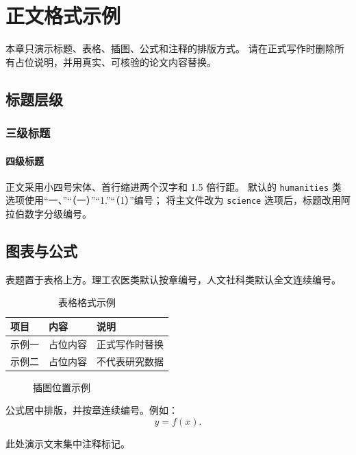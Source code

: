 \chapter{正文格式示例}

本章只演示标题、表格、插图、公式和注释的排版方式。
请在正式写作时删除所有占位说明，并用真实、可核验的论文内容替换。

\section{标题层级}

\subsection{三级标题}

\subsubsection{四级标题}

正文采用小四号宋体、首行缩进两个汉字和 1.5 倍行距。
默认的 \texttt{humanities} 类选项使用“一、”“（一）”“1.”“（1）”编号；
将主文件改为 \texttt{science} 选项后，标题改用阿拉伯数字分级编号。

\section{图表与公式}

表题置于表格上方。理工农医类默认按章编号，人文社科类默认全文连续编号。

\begin{table}[htbp]
  \centering
  \caption{表格格式示例}
  \label{tab:format-example}
  \begin{tabular}{lll}
    \toprule
    项目 & 内容 & 说明 \\
    \midrule
    示例一 & 占位内容 & 正式写作时替换 \\
    示例二 & 占位内容 & 不代表研究数据 \\
    \bottomrule
  \end{tabular}
\end{table}

\begin{figure}[htbp]
  \centering
  \fbox{\rule{0pt}{4cm}\rule{8cm}{0pt}}
  \caption{插图位置示例}
  \label{fig:format-example}
\end{figure}

公式居中排版，并按章连续编号。例如：
\begin{equation}
  y = f(x).
  \label{eq:format-example}
\end{equation}

此处演示文末集中注释标记。
